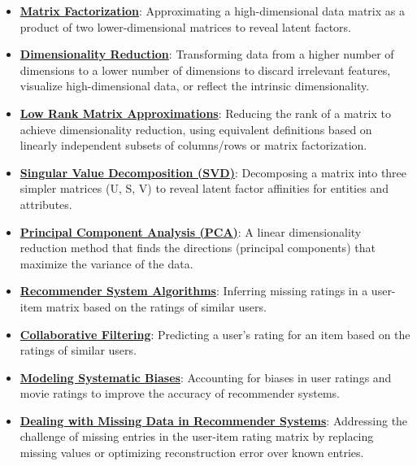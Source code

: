 \documentclass{article}%
\begin{document}
\begin{itemize}[leftmargin=*]%
\item \href{https://www.math.purdue.edu/~yipn/351/11L2-svd-pca-recommender.pdf#page=13}{\textbf{Matrix Factorization}}: Approximating a high-dimensional data matrix as a product of two lower-dimensional matrices to reveal latent factors.%
\item \href{https://www.math.purdue.edu/~yipn/351/11L2-svd-pca-recommender.pdf#page=8}{\textbf{Dimensionality Reduction}}: Transforming data from a higher number of dimensions to a lower number of dimensions to discard irrelevant features, visualize high-dimensional data, or reflect the intrinsic dimensionality.%
\item \href{https://www.math.purdue.edu/~yipn/351/11L2-svd-pca-recommender.pdf#page=9}{\textbf{Low Rank Matrix Approximations}}: Reducing the rank of a matrix to achieve dimensionality reduction, using equivalent definitions based on linearly independent subsets of columns/rows or matrix factorization.%
\item \href{https://www.math.purdue.edu/~yipn/351/11L2-svd-pca-recommender.pdf#page=10}{\textbf{Singular Value Decomposition (SVD)}}: Decomposing a matrix into three simpler matrices (U, S, V) to reveal latent factor affinities for entities and attributes.%
\item \href{https://www.math.purdue.edu/~yipn/351/11L2-svd-pca-recommender.pdf#page=15}{\textbf{Principal Component Analysis (PCA)}}: A linear dimensionality reduction method that finds the directions (principal components) that maximize the variance of the data.%
\item \href{https://www.math.purdue.edu/~yipn/351/11L2-svd-pca-recommender.pdf#page=31}{\textbf{Recommender System Algorithms}}: Inferring missing ratings in a user-item matrix based on the ratings of similar users.%
\item \href{https://www.math.purdue.edu/~yipn/351/11L2-svd-pca-recommender.pdf#page=33}{\textbf{Collaborative Filtering}}: Predicting a user's rating for an item based on the ratings of similar users.%
\item \href{https://www.math.purdue.edu/~yipn/351/11L2-svd-pca-recommender.pdf#page=40}{\textbf{Modeling Systematic Biases}}: Accounting for biases in user ratings and movie ratings to improve the accuracy of recommender systems.%
\item \href{https://www.math.purdue.edu/~yipn/351/11L2-svd-pca-recommender.pdf#page=39}{\textbf{Dealing with Missing Data in Recommender Systems}}: Addressing the challenge of missing entries in the user-item rating matrix by replacing missing values or optimizing reconstruction error over known entries.%
\end{itemize}%
\end{document}
